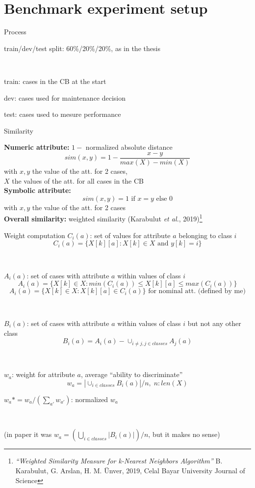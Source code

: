 \documentclass[]{beamer}
\begin{document}
\section{Benchmark experiment setup}
\begin{frame}{Process}

    train/dev/test split: 60\%/20\%/20\%, as in the thesis

    ~

    train: cases in the CB at the start

    dev: cases used for maintenance decision

    test: cases used to mesure performance
    
\end{frame}
\begin{frame}{Similarity}

    \textbf{Numeric attribute:} $1 -$ normalized absolute distance
    $$sim(x,y) = 1 - \frac{x-y}{max(X) - min(X)}$$
    with $x,y$ the value of the att. for 2 cases,\\
    $X$ the values of the att. for all cases in the CB
    \\[2em]

    \textbf{Symbolic attribute:}
    $$sim(x,y) = 1 \text{ if } x=y \text{ else } 0$$
    with $x,y$ the value of the att. for 2 cases
    \\[2em]

    \textbf{Overall similarity:}
    weighted similarity (Karabulut \textit{et al.}, 2019)\footnote{\textit{``Weighted Similarity Measure for k-Nearest Neighbors Algorithm''}
    B. Karabulut, G. Arslan, H. M. Ünver, 2019, Celal Bayar University Journal of Science
}%

\end{frame}
\begin{frame}{Weight computation}
    \smaller
    $C_i(a)$: set of values for attribute $a$ belonging to class $i$
    $$C_i(a) = \{X[k][a]: X[k] \in X \text{ and }y[k]=i\}$$
    
~

    $A_i(a)$: set of cases with attribute $a$ within values of class $i$
    $$A_i(a) = \{X[k] \in X: min(C_i(a)) \leq X[k][a] \leq max(C_i(a))\}$$
    $$A_i(a) = \{X[k] \in X: X[k][a] \in C_i(a)\} \text{ for nominal att. (defined by me)}$$
    
~

    $B_i(a)$: set of cases with attribute $a$ within values of class $i$ but not any other class
    $$B_i(a) = A_i(a) - \cup_{i\ne j, j\in classes} A_j(a)$$
    
~

    $w_a$: weight for attribute $a$, average ``ability to discriminate''
    $$w_a=|\cup_{i\in classes} B_i(a)| / n, \; n: len(X)$$ 
    
    $w_a*=w_a/(\sum_{a'} w_{a'})$: normalized $w_a$

    ~

    {\smaller\smaller(in paper it was $w_a=(\bigcup_{i\in classes} |B_i(a)|) / n$, but it makes no sense)}

\end{frame}
\end{document}
